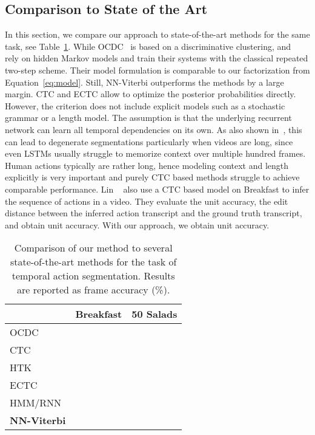 \documentclass[10pt,twocolumn,letterpaper]{article}
\begin{document}
\subsection{Comparison to State of the Art}

In this section, we compare our approach to state-of-the-art methods for the same task,
see Table~\ref{tab:actionSegmentation}.
While OCDC~\cite{bojanowski14weakly} is based on a discriminative clustering,
\cite{kuehne16end} and~\cite{richard2017weakly} rely on hidden Markov models and train
their systems with the classical repeated two-step scheme. Their model formulation is
comparable to our factorization from Equation~\eqref{eq:model}. Still, NN-Viterbi outperforms
the methods by a large margin.
CTC and ECTC allow to optimize the posterior probabilities  directly.
However, the criterion does not include explicit models such as a stochastic
grammar or a length model. The assumption is that the underlying recurrent network can learn
all temporal dependencies on its own. As also shown in~\cite{huang2016connectionist}, this can
lead to degenerate segmentations particularly when videos are long, since even LSTMs usually struggle
to memorize context over multiple hundred frames.
Human actions typically are rather long, hence modeling context and length explicitly is very
important and purely CTC based methods struggle to achieve comparable performance.
Lin \etal~\cite{lin2017ctc} also use a CTC based model on Breakfast to infer the sequence of actions in a video.
They evaluate the unit accuracy, \ie the edit distance between the inferred action transcript
and the ground truth transcript, and obtain  unit accuracy. With our approach,
we obtain  unit accuracy.

\begin{table}
    \footnotesize
    \begin{tabularx}{0.48\textwidth}{Xrr}
        \toprule
                                            & \textbf{Breakfast} & \textbf{50 Salads} \\
        \midrule
        OCDC \cite{bojanowski14weakly}      &             &               \\
        CTC  \cite{huang2016connectionist}  &            &            \\
        HTK  \cite{kuehne16end}             &            &            \\
        ECTC \cite{huang2016connectionist}  &            &               \\
        HMM/RNN \cite{richard2017weakly}    &            &            \\
        \midrule
        \textbf{NN-Viterbi}            &   &   \\
        \bottomrule
    \end{tabularx}
    \caption{Comparison of our method to several state-of-the-art methods for the task of
             temporal action segmentation. Results are reported as frame accuracy (\%).}
    \label{tab:actionSegmentation}
\end{table}
\end{document}
